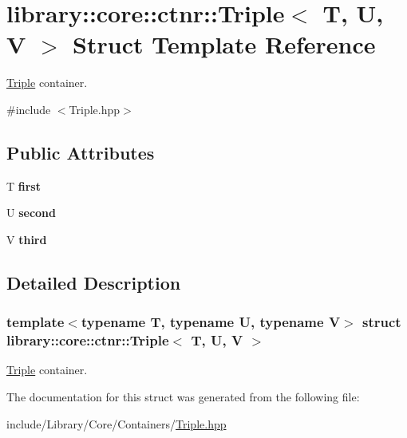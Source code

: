 \hypertarget{structlibrary_1_1core_1_1ctnr_1_1_triple}{}\section{library\+:\+:core\+:\+:ctnr\+:\+:Triple$<$ T, U, V $>$ Struct Template Reference}
\label{structlibrary_1_1core_1_1ctnr_1_1_triple}


\hyperlink{structlibrary_1_1core_1_1ctnr_1_1_triple}{Triple} container.  




{\ttfamily \#include $<$Triple.\+hpp$>$}

\subsection*{Public Attributes}
\begin{DoxyCompactItemize}
\item 
\mbox{\label{structlibrary_1_1core_1_1ctnr_1_1_triple_a620996265dbacc4b8961fcdd4694d1f4}} 
T {\bfseries first}
\item 
\mbox{\label{structlibrary_1_1core_1_1ctnr_1_1_triple_a6727b9eb6453f0db0d0abfcd64dbc87e}} 
U {\bfseries second}
\item 
\mbox{\label{structlibrary_1_1core_1_1ctnr_1_1_triple_a5fdac90c0f2e7a33f2fc5f3fc4dba8e2}} 
V {\bfseries third}
\end{DoxyCompactItemize}


\subsection{Detailed Description}
\subsubsection*{template$<$typename T, typename U, typename V$>$\newline
struct library\+::core\+::ctnr\+::\+Triple$<$ T, U, V $>$}

\hyperlink{structlibrary_1_1core_1_1ctnr_1_1_triple}{Triple} container. 

The documentation for this struct was generated from the following file\+:\begin{DoxyCompactItemize}
\item 
include/\+Library/\+Core/\+Containers/\hyperlink{_triple_8hpp}{Triple.\+hpp}\end{DoxyCompactItemize}
